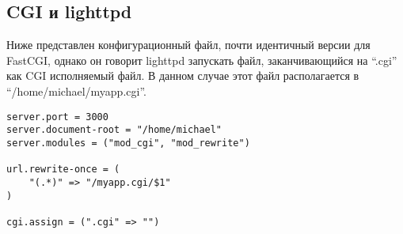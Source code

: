 \subsection{CGI и lighttpd}
%
Ниже представлен конфигурационный файл, почти идентичный версии для FastCGI, однако он говорит lighttpd запускать файл, заканчивающийся на ``.cgi'' как CGI исполняемый файл. В данном случае этот файл располагается в ``/home/michael/myapp.cgi''.
%
\begin{lstlisting}
server.port = 3000
server.document-root = "/home/michael"
server.modules = ("mod_cgi", "mod_rewrite")

url.rewrite-once = (
    "(.*)" => "/myapp.cgi/$1"
)

cgi.assign = (".cgi" => "")
\end{lstlisting}
